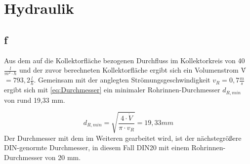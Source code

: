 \section{Hydraulik}
\label{sec:Hydraulik}
\subsection{f}
Aus dem auf die Kollektorfläche bezogenen Durchfluss im Kollektorkreis von 40 $\frac{l}{m^2\cdot h}$
und der zuvor berechneten Kollektorfläche ergibt sich ein Volumenstrom \.V $=793,2 \frac{l}{h}$.
Gemeinsam mit der anglegten Strömungsgeschwindigkeit $v_R = 0,7 \frac{m}{s}$ ergibt sich mit \autoref{eq:Durchmesser} \cite[S.42]{Sick22}
ein minimaler Rohrinnen-Durchmesser $d_{R,min}$ von rund 19,33 mm.

\begin{equation}
    d_{R,min}=\sqrt{\frac{4 \cdot \dot{V}}{\pi \cdot v_R}}=19,33 mm
    \label{eq:Durchmesser}
\end{equation}
\vspace{\baselineskip}
Der Durchmesser mit dem im Weiteren gearbeitet wird, ist der nächstegrößere DIN-genormte Durchmesser,
in diesem Fall DIN20 mit einem Rohrinnen-Durchmesser von 20 mm.\\